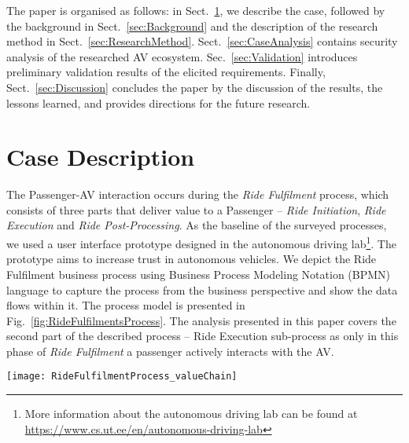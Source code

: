 \documentclass[manuscript]{acmart}
\begin{document}
The paper is organised as follows: in Sect.~\ref{sec:CaseDescription}, we describe the case, followed by the background in Sect.~\ref{sec:Background} and the description of the research method in Sect.~\ref{sec:ResearchMethod}. Sect.~\ref{sec:CaseAnalysis} contains security analysis of the researched AV ecosystem.
Sec.~\ref{sec:Validation} introduces preliminary validation results of the elicited requirements. Finally, Sect.~\ref{sec:Discussion} concludes the paper by the discussion of the results, the lessons learned, and provides directions for the future research.

\section{Case Description} \label{sec:CaseDescription}

The Passenger-AV interaction occurs during the \textit{Ride Fulfilment} process, which consists of three parts that deliver value to a Passenger -- \textit{Ride Initiation}, \textit{Ride Execution} and \textit{Ride Post-Processing}. As the baseline of the surveyed processes, we used a user interface prototype %
designed in the autonomous driving lab\footnote{More information about the autonomous driving lab can be found at \textcolor{blue}{\url{https://www.cs.ut.ee/en/autonomous-driving-lab}}}. The prototype aims to increase trust in autonomous vehicles. We depict the Ride Fulfilment business process using Business Process Modeling Notation (BPMN) language to capture the process from the business perspective and show the data flows within it. The process model is presented in Fig.~\ref{fig:RideFulfilmentsProcess}. The analysis presented in this paper covers the second part of the described process – Ride Execution sub-process as only in this phase of \textit{Ride Fulfilment} a passenger actively interacts with the AV.
 
\begin{figure*}[!ht]
    \centering
    \texttt{[image: RideFulfilmentProcess\_valueChain]}%
    \caption{Ride Fulfilment business process~\cite{PassengerDataProtection}} \label{fig:RideFulfilmentsProcess}
\end{figure*}
\end{document}
